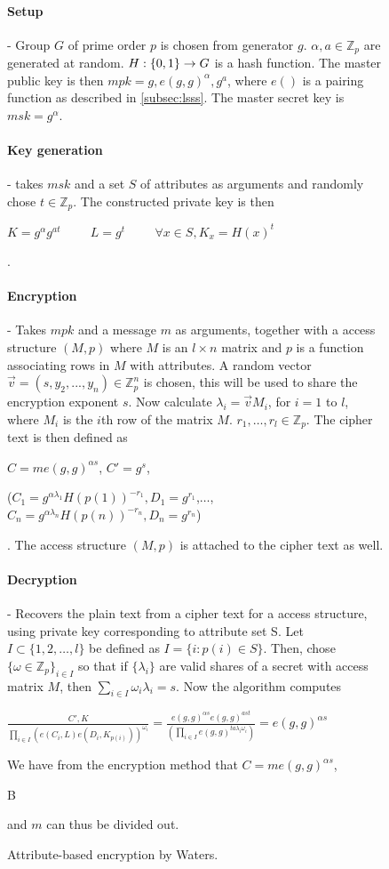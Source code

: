 \begin{figure}
\begin{mdframed}
\paragraph{Setup} - Group $G$ of prime order $p$ is chosen from generator $g$. $\alpha, a \in \mathbb{Z}_p$ are generated at random. $H: \{0,1\}\* \rightarrow G$ is a hash function. The master public key is then $mpk = g, e(g,g)^{\alpha}, g^a$, where $e()$ is a pairing function as described in \ref{subsec:lsss}. The master secret key is $msk = g^{\alpha}$.
\
\paragraph{Key generation} - takes $msk$ and a set $S$ of attributes as arguments and randomly chose $t \in \mathbb{Z}_p$. The constructed private key is then \\ \centerline{$K = g^{\alpha}g^{at}\hspace{1cm} L = g^t \hspace{1cm}   \forall x\in S, K_x = H(x)^t$}.
\\
\paragraph{Encryption} - Takes $mpk$ and a message $m$ as arguments, together with a access structure $(M,p)$ where $M$ is an $l\times n$ matrix and $p$ is a function associating rows in $M$ with attributes. A random vector $\vec{v} = (s, y_2, ..., y_n)\in \mathbb{Z}_p^n$ is chosen, this will be used to share the encryption exponent $s$. Now calculate $\lambda_i = \vec{v} M_i$, for $i=1$ to $l$, where $M_i$ is the $i$th row of the matrix $M$. $r_1,\dots,r_l \in \mathbb{Z}_p$. The cipher text is then defined as\\
\centerline{$C=me(g,g)^{\alpha s}$, $C'=g^s$,}
\centerline{($C_1 = g^{\alpha \lambda_1} H(p(1))^{-r_1}, D_1=g^{r_1}$,$\dots$,$C_n = g^{\alpha \lambda_n} H(p(n))^{-r_n}, D_n=g^{r_n}$)}.
The access structure $(M,p)$ is attached to the cipher text as well.
\\
\paragraph{Decryption} - Recovers the plain text from a cipher text for a access structure, using private key corresponding to attribute set S. Let $I \subset \{1,2,\dots,l\}$ be defined as $I = \{i : p(i) \in S\}$. Then, chose $\{\omega \in \mathbb{Z}_p\}_{i\in I}$ so that if $\{\lambda_i\}$ are valid shares of a secret with access matrix $M$, then $\sum_{i\in I}\omega_i \lambda_i = s$. Now the algorithm computes
\centerline{$\frac{C',K }{\prod_{i\in I}(e(C_i,L)e(D_i,K_{p(i)}))^{\omega_i}} = \frac{e(g,g)^{\alpha s}e(g,g)^{ast}}{(\prod_{i\in I}e(g,g)^{ta\lambda_i\omega_i})}=e(g,g)^{\alpha s}$}
\centerline{We have from the encryption method that $C=me(g,g)^{\alpha s}$, }B
\centerline{and $m$ can thus be divided out.}

\caption{Attribute-based encryption by Waters.}
\label{fig:abe_math}
\end{mdframed}
\end{figure}

